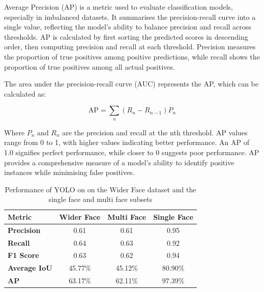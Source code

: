 Average Precision (AP) is a metric used to evaluate classification models, especially in imbalanced datasets. It summarises the precision-recall curve into a single value, reflecting the model's ability to balance precision and recall across thresholds. AP is calculated by first sorting the predicted scores in descending order, then computing precision and recall at each threshold. Precision measures the proportion of true positives among positive predictions, while recall shows the proportion of true positives among all actual positives.

The area under the precision-recall curve (AUC) represents the AP, which can be calculated as:

\[
\text{AP} = \sum_n (R_n - R_{n-1}) P_n
\]

Where \(P_{n}\) and \(R_{n}\) are the precision and recall at the nth threshold. AP values range from 0 to 1, with higher values indicating better performance. An AP of 1.0 signifies perfect performance, while closer to 0 suggests poor performance. AP provides a comprehensive measure of a model's ability to identify positive instances while minimising false positives.

\begin{table}[h!]
\centering{}
\caption{Performance of YOLO on on the Wider Face dataset and the single face and multi face subsets}
\begin{tabular}{|l|c|c|c|}
\hline
\textbf{Metric}      & \textbf{Wider Face} & \textbf{Multi Face}  & \textbf{Single Face} \\ \hline
\textbf{Precision}   & 0.61        & 0.61            & 0.95                 \\ \hline
\textbf{Recall}      & 0.64        & 0.63            & 0.92                 \\ \hline
\textbf{F1 Score}    & 0.63        & 0.62            & 0.94                 \\ \hline
\textbf{Average IoU} & 45.77\%     & 45.12\%         & 80.90\%              \\ \hline
\textbf{AP}          & 63.17\%     & 62.11\%         & 97.39\%              \\ \hline
\end{tabular}
\label{tab:YOLO}
\end{table}

